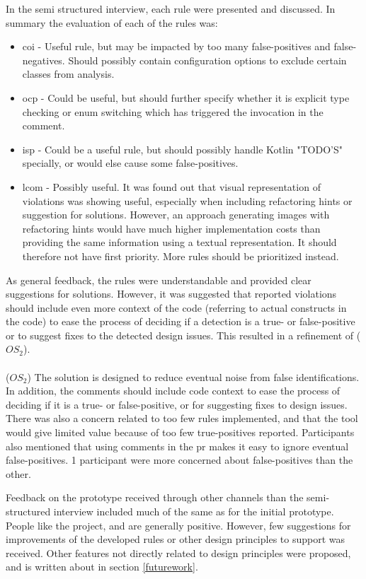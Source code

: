 \documentclass[pdftex,10pt,b5paper,twoside]{report}
\begin{document}
In the semi structured interview, each rule were presented and discussed. In summary the evaluation of each of the rules was:
\begin{itemize}
    \item \gls{coi} - Useful rule, but may be impacted by too many false-positives and false-negatives. Should possibly contain configuration options to exclude certain classes from analysis.
\item \gls{ocp} - Could be useful, but should further specify whether it is explicit type checking or enum switching which has triggered the invocation in the comment. 
\item \gls{isp} - Could be a useful rule, but should possibly handle Kotlin "TODO'S" specially, or would else cause some false-positives.
\item \gls{lcom} - Possibly useful. It was found out that visual representation of violations was showing useful, especially when including refactoring hints or suggestion for solutions. However, an approach generating images with refactoring hints would have much higher implementation costs than providing the same information using a textual representation. It should therefore not have first priority. More rules should be prioritized instead.
\end{itemize}

As general feedback, the rules were understandable and provided clear suggestions for solutions. However, it was suggested that reported violations should include even more context of the code (referring to actual constructs in the code) to ease the process of deciding if a detection is a true- or false-positive or to suggest fixes to the detected design issues. This resulted in a refinement of (\(OS_{2}\)). \\\\(\(OS_{2}\)) The solution is designed to reduce eventual noise from false identifications. In addition, the comments should include code context to ease the process of deciding if it is a true- or false-positive, or for suggesting fixes to design issues. \\

There was also a concern related to too few rules implemented, and that the tool would give limited value because of too few true-positives reported. Participants also mentioned that using comments in the \gls{pr} makes it easy to ignore eventual false-positives. 1 participant were more concerned about false-positives than the other.

Feedback on the prototype received through other channels than the semi-structured interview included much of the same as for the initial prototype. People like the project, and are generally positive. However, few suggestions for improvements of the developed rules or other design principles to support was received. Other features not directly related to design principles were proposed, and is written about in section \ref{futurework}.
\end{document}
